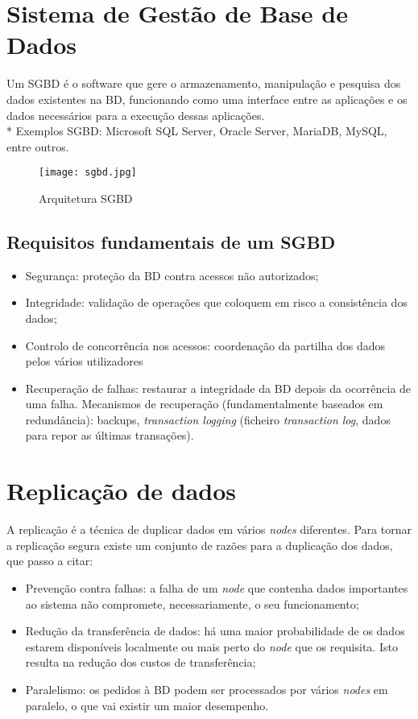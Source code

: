 \cleardoublepage
\section{Sistema de Gestão de Base de Dados}
Um \ac{SGBD} é o software que gere o armazenamento, manipulação e pesquisa dos dados existentes na \ac{BD}, funcionando como uma interface entre as aplicações e os dados necessários para a execução dessas aplicações.\\*
\indent Exemplos \ac{SGBD}: Microsoft SQL Server, Oracle Server, MariaDB, MySQL, entre outros.


\begin{figure}[H]
\center
\texttt{[image: sgbd.jpg]}
\caption{Arquitetura \ac{SGBD}}
\end{figure}

\subsection{Requisitos fundamentais de um SGBD}
\begin{itemize}
    \item Segurança: proteção da \ac{BD} contra acessos não autorizados;
    \item Integridade: validação de operações que coloquem em risco a consistência dos dados;
    \item Controlo de concorrência nos acessos: coordenação da partilha dos dados pelos vários utilizadores
    \item Recuperação de falhas: restaurar a integridade da \ac{BD} depois da ocorrência de uma falha. Mecanismos de recuperação (fundamentalmente baseados em redundância): backups, \textit{transaction logging} (ficheiro \textit{transaction log}, dados para repor as últimas transações).
\end{itemize}

\cleardoublepage
\section{Replicação de dados}
A replicação é a técnica de duplicar dados em vários \textit{nodes} diferentes. Para tornar a replicação segura existe um conjunto de razões para a duplicação dos dados, que passo a citar:

\begin{itemize}
    \item Prevenção contra falhas: a falha de um \textit{node} que contenha dados importantes ao sistema não compromete, necessariamente, o seu funcionamento;
    \item Redução da transferência de dados: há uma maior probabilidade de os dados estarem disponíveis localmente ou mais perto do \textit{node} que os requisita. Isto resulta na redução dos custos de transferência;
    \item Paralelismo: os pedidos à \ac{BD} podem ser processados por vários \textit{nodes} em paralelo, o que vai existir um maior desempenho.
\end{itemize}


